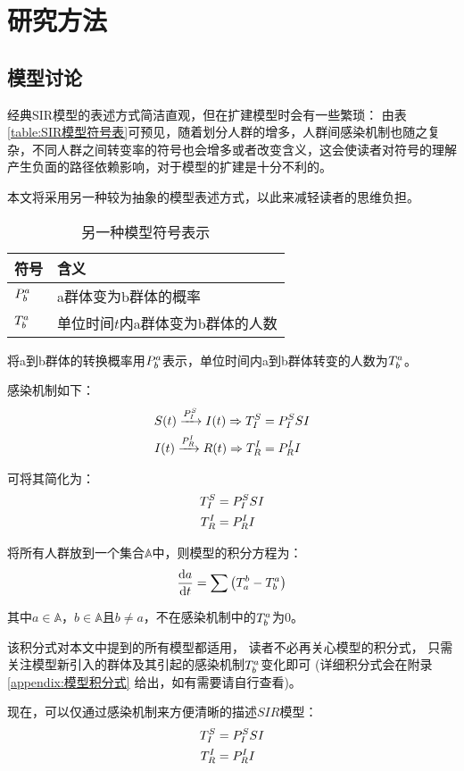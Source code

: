 \section{研究方法}
\subsection{模型讨论}
\par 经典SIR模型的表述方式简洁直观，但在扩建模型时会有一些繁琐：
由表\ref{table:SIR模型符号表}可预见，随着划分人群的增多，人群间感染机制也随之复杂，不同人群之间转变率的符号也会增多或者改变含义，这会使读者对符号的理解产生负面的路径依赖影响，对于模型的扩建是十分不利的。
\par 本文将采用另一种较为抽象的模型表述方式，以此来减轻读者的思维负担。
\begin{table}[H]
    \centering
    \caption{另一种模型符号表示}
    \begin{tabular}{ll}
        \hline
        符号       & 含义                              \\
        \hline
        $\P{a}{b}$ & a群体变为b群体的概率              \\
        $\T{a}{b}$ & 单位时间$t$内a群体变为b群体的人数 \\
        \hline
    \end{tabular}
\end{table}
\par 将a到b群体的转换概率用$\P{a}{b}$表示，单位时间内a到b群体转变的人数为$\T{a}{b}$。
\par 感染机制如下：
\begin{align}
    S(t)\xrightarrow{\P{S}{I}}I(t) \Rightarrow \TP{S}{I}{SI} \\
    I(t)\xrightarrow{\P{I}{R}}R(t) \Rightarrow \TP{I}{R}{I}
\end{align}
\par 可将其简化为：
\begin{align}
    \TP{S}{I}{SI} \\
    \TP{I}{R}{I}
\end{align}
\par 将所有人群放到一个集合$\mathbb{A}$中，则模型的积分方程为：
\begin{equation}
    \dt{a} = \sum\left(\T{b}{a}-\T{a}{b}\right)
\end{equation}
\par 其中$a\in\mathbb{A}$，$b\in\mathbb{A}$且$b\not=a$，不在感染机制中的$\T{a}{b}$为$0$。
\par 该积分式对本文中提到的所有模型都适用，
读者不必再关心模型的积分式，
只需关注模型新引入的群体及其引起的感染机制$\T{a}{b}$变化即可
(详细积分式会在附录\ref{appendix:模型积分式} 给出，如有需要请自行查看)。
\par 现在，可以仅通过感染机制来方便清晰的描述$SIR$模型：
\begin{align}
    \TP{S}{I}{SI} \\
    \TP{I}{R}{I}
\end{align}
